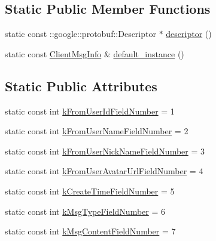 \subsection*{Static Public Member Functions}
\begin{DoxyCompactItemize}
\item 
static const \+::google\+::protobuf\+::\+Descriptor $\ast$ \hyperlink{class_i_m_1_1_base_define_1_1_client_msg_info_a6990d21dbb15e81f930344bdd203f6cd}{descriptor} ()
\item 
static const \hyperlink{class_i_m_1_1_base_define_1_1_client_msg_info}{Client\+Msg\+Info} \& \hyperlink{class_i_m_1_1_base_define_1_1_client_msg_info_a320e2d346bbc2ca45c8f517a4155fd3b}{default\+\_\+instance} ()
\end{DoxyCompactItemize}
\subsection*{Static Public Attributes}
\begin{DoxyCompactItemize}
\item 
static const int \hyperlink{class_i_m_1_1_base_define_1_1_client_msg_info_ab30b74616de35ff4c4129c8cfd7f6fb7}{k\+From\+User\+Id\+Field\+Number} = 1
\item 
static const int \hyperlink{class_i_m_1_1_base_define_1_1_client_msg_info_a5186d47053c4d4e92d3bff03b8f8cbd0}{k\+From\+User\+Name\+Field\+Number} = 2
\item 
static const int \hyperlink{class_i_m_1_1_base_define_1_1_client_msg_info_a2a07b5b96f1db9bf86431a3a351966e3}{k\+From\+User\+Nick\+Name\+Field\+Number} = 3
\item 
static const int \hyperlink{class_i_m_1_1_base_define_1_1_client_msg_info_a095303faf039243a69c0933995a43e58}{k\+From\+User\+Avatar\+Url\+Field\+Number} = 4
\item 
static const int \hyperlink{class_i_m_1_1_base_define_1_1_client_msg_info_a3bc8d49f34f3f47066424f19f2b2fbda}{k\+Create\+Time\+Field\+Number} = 5
\item 
static const int \hyperlink{class_i_m_1_1_base_define_1_1_client_msg_info_a2cf24289a0596e5cfe62d318c05ef7f0}{k\+Msg\+Type\+Field\+Number} = 6
\item 
static const int \hyperlink{class_i_m_1_1_base_define_1_1_client_msg_info_a5db40ccf2536caf7692a08e7d64eb594}{k\+Msg\+Content\+Field\+Number} = 7
\end{DoxyCompactItemize}
